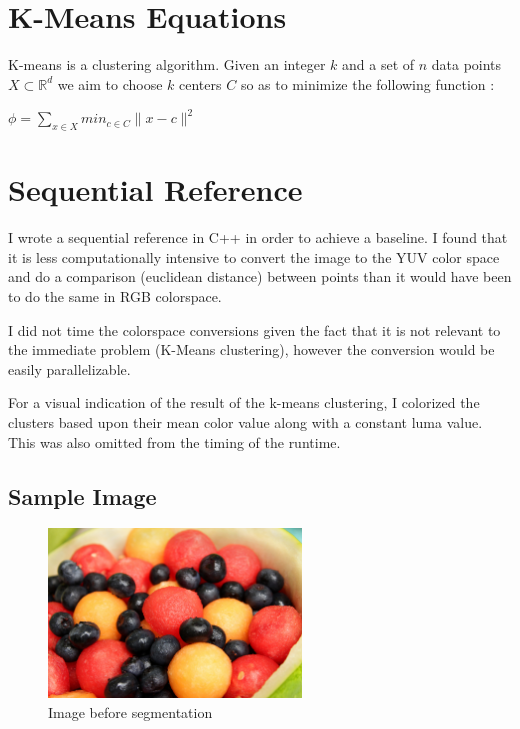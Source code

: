 \documentclass[11pt]{article}
\begin{document}
\section{K-Means Equations}

K-means is a clustering algorithm. Given an integer $k$ and a set of $n$ data points $X \subset \mathbb{R}^d$ we aim to choose $k$ centers $C$ so as to minimize the following function \cite{arthur}:
\newline

\begin{math}
\phi = \displaystyle\sum_{x \in X} min_{c \in C }\| x - c \|^2
\end{math}

\section{Sequential Reference}

I wrote a sequential reference in C++ in order to achieve a baseline. I found that
it is less computationally intensive to convert the image to the YUV color space and
do a comparison (euclidean distance) between points than it would have been to do
the same in RGB colorspace.

I did not time the colorspace conversions given the fact that it is not relevant to the
immediate problem (K-Means clustering), however the conversion would be easily
parallelizable.

For a visual indication of the result of the k-means clustering, I colorized the clusters
based upon their mean color value along with a constant luma value. This was also omitted
from the timing of the runtime.


\subsection{Sample Image}

\begin{figure}[ht]
    \centering
    \includegraphics[width=0.6\textwidth]{fruit.png}
    \caption{Image\cite{fruit} before segmentation}
    \label{fig:fruit}
\end{figure}
\end{document}
